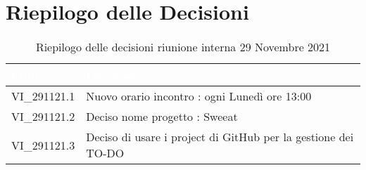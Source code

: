 \section{Riepilogo delle Decisioni}


\begin{table}[!htbp]
\renewcommand{\arraystretch}{1.5}
\begin{tabular}{m{}<{\centering}  m{}<{\centering}}
\rowcolor{darkblue} \textcolor{white}{\textbf{Codice}} & \textcolor{white}{\textbf{Decisione}} \\
\hline
VI\_291121.1 & Nuovo orario incontro : ogni Lunedì ore 13:00 \\
\rowcolor{gray!10} VI\_291121.2 & Deciso nome progetto : Sweeat \\
VI\_291121.3 & Deciso di usare i project di GitHub per la gestione dei TO-DO\\
\end{tabular}
\caption{Riepilogo delle decisioni riunione interna 29 Novembre 2021}
\end{table}